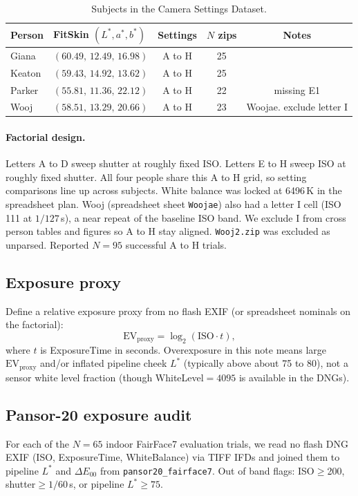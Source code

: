 \documentclass[11pt]{article}
\newcommand{\deee}{\ensuremath{\Delta E_{00}}}
\newcommand{\EV}{\mathrm{EV}_{\mathrm{proxy}}}
\begin{document}
\begin{table}[t]
\centering
\caption{Subjects in the Camera Settings Dataset.}
\label{tab:subjects}
\begin{tabular}{@{}llccc@{}}
\toprule
Person & FitSkin $(L^*,a^*,b^*)$ & Settings & $N$ zips & Notes \\
\midrule
Giana  & $(60.49,\,12.49,\,16.98)$ & A to H & 25 &  \\
Keaton & $(59.43,\,14.92,\,13.62)$ & A to H & 25 &  \\
Parker & $(55.81,\,11.36,\,22.12)$ & A to H & 22 & missing E1 \\
Wooj   & $(58.51,\,13.29,\,20.66)$ & A to H & 23 & Woojae. exclude letter I \\
\bottomrule
\end{tabular}
\end{table}

\paragraph{Factorial design.}
Letters A to D sweep shutter at roughly fixed ISO. Letters E to H sweep ISO at roughly fixed shutter.
All four people share this A to H grid, so setting comparisons line up across subjects.
White balance was locked at 6496\,K in the spreadsheet plan.
Wooj (spreadsheet sheet \texttt{Woojae}) also had a letter I cell (ISO 111 at $1/127$\,s), a near repeat of the baseline ISO band. We exclude I from cross person tables and figures so A to H stay aligned.
\texttt{Wooj2.zip} was excluded as unparsed.
Reported $N=95$ successful A to H trials.

\subsection{Exposure proxy}
Define a relative exposure proxy from no flash EXIF (or spreadsheet nominals on the factorial):
\begin{equation}
  \EV = \log_2(\mathrm{ISO}\cdot t),
\end{equation}
where $t$ is ExposureTime in seconds.
Overexposure in this note means large $\EV$ and/or inflated pipeline cheek $L^*$ (typically above about 75 to 80), not a sensor white level fraction (though WhiteLevel$=4095$ is available in the DNGs).

\subsection{Pansor-20 exposure audit}
For each of the $N=65$ indoor FairFace7 evaluation trials, we read no flash DNG EXIF (ISO, ExposureTime, WhiteBalance) via TIFF IFDs and joined them to pipeline $L^*$ and $\deee$ from \texttt{pansor20\_fairface7}.
Out of band flags: ISO$\ge$200, shutter$\ge 1/60$\,s, or pipeline $L^*\ge 75$.
\end{document}
